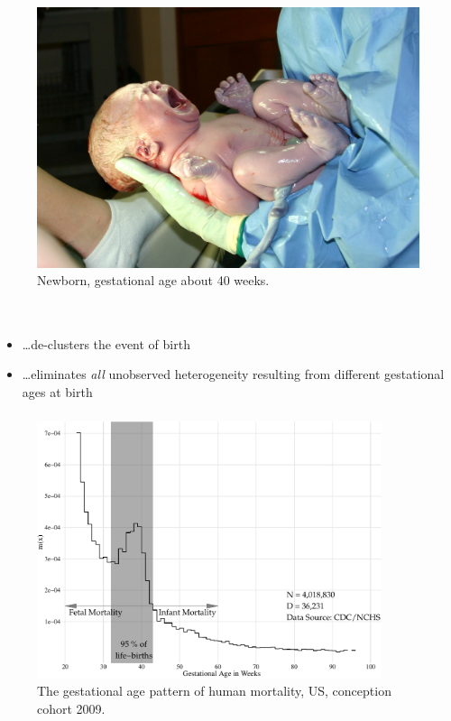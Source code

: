 \documentclass{beamer}
\begin{document}
\begin{frame}
\begin{columns}[c]
\begin{figure}[htb!]
\includegraphics[]{./fig/newborn.jpg} \\
Newborn, gestational age about 40 weeks.
\end{figure}

\end{columns}

\end{frame}

\begin{frame}
\frametitle{\insertsection}

\begin{itemize}
\item \ldots de-clusters the event of birth
\item \ldots eliminates \emph{all} unobserved heterogeneity resulting from different gestational ages at birth
\end{itemize}

\end{frame}

\begin{frame}
\frametitle{\insertsection}

\begin{figure}[htb!]
\includegraphics[width = 0.9\textwidth]{./fig/fimort_mx.pdf} \\
The gestational age pattern of human mortality, US, conception cohort 2009.
\end{figure}

\end{frame}
\end{document}
